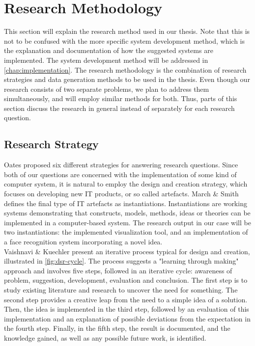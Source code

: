 \section{Research Methodology}

This section will explain the research method used in our thesis. Note that this is not to be confused with the more specific system development method, which is the explanation and documentation of how the suggested systems are implemented. The system development method will be addressed in \autoref{chap:implementation}. The research methodology is the combination of research strategies and data generation methods to be used in the thesis. Even though our research consists of two separate problems, we plan to address them simultaneously, and will employ similar methods for both. Thus, parts of this section discuss the research in general instead of separately for each research question.

\subsection{Research Strategy}

Oates \cite{oates} proposed six different strategies for answering research questions. Since both of our questions are concerned with the implementation of some kind of computer system, it is natural to employ the design and creation strategy, which focuses on developing new IT products, or so called artefacts. March \& Smith \cite{march-smith} defines the final type of IT artefacts as instantiations. Instantiations are working systems demonstrating that constructs, models, methods, ideas or theories can be implemented in a computer-based system. The research output in our case will be two instantiations: the implemented visualization tool, and an implementation of a face recognition system incorporating a novel idea. \\

\noindent Vaishnavi \& Kuechler \cite{designscience} present an iterative process typical for design and creation, illustrated in \autoref{fig:dsr-cycle}. The process suggests a "learning through making" approach and involves five steps, followed in an iterative cycle: awareness of problem, suggestion, development, evaluation and conclusion. The first step is to study existing literature and research to uncover the need for something. The second step provides a creative leap from the need to a simple idea of a solution. Then, the idea is implemented in the third step, followed by an evaluation of this implementation and an explanation of possible deviations from the expectation in the fourth step. Finally, in the fifth step, the result is documented, and the knowledge gained, as well as any possible future work, is identified. \\

